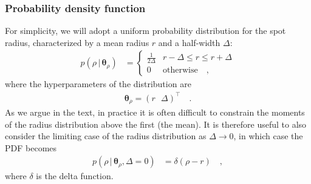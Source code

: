 \documentclass[modern]{aastex62}
\begin{document}
\subsubsection{Probability density function}
%
For simplicity, we will adopt a uniform probability distribution for the
spot radius, characterized by a mean radius $r$ and a half-width $\Delta$:
%
\begin{align}
    p(\rho \, \big| \, \pmb{\theta}_{\rho})
     & =
    \begin{cases}
        \frac{1}{2\Delta} & r - \Delta \leq r \leq r + \Delta
        \\
        0                 & \mathrm{otherwise}
        \quad,
    \end{cases}
\end{align}
%
where the hyperparameters of the distribution are
%
\begin{align}
    \pmb{\theta}_\rho = \left(
    r \, \, \, \,
    \Delta \right)^\top
    \quad.
\end{align}
%
As we argue in the text, in practice it is often difficult to constrain the
moments of the radius distribution above the first (the mean). It is
therefore useful to also consider the limiting case of the radius distribution
as $\Delta \rightarrow 0$, in which case the PDF becomes
%
\begin{align}
    p(\rho \, \big| \, \pmb{\theta}_{\rho}, \Delta = 0)
     & =
    \delta(\rho - r)
    \quad,
\end{align}
%
where $\delta$ is the delta function.
%
\end{document}
